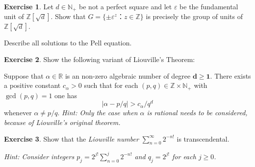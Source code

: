 \documentclass[12pt,a4paper]{article}
\theoremstyle{plain}
\newtheorem*{Sol*}{Solution}
\theoremstyle{definition}
\newtheorem{Ex}{Exercise}
\newif\ifsolutions
\newcommand{\exercise}[2]{
			\begin{Ex} #1 \end{Ex}
			\ifsolutions  \begin{Sol*} #2 \end{Sol*} \bigskip \else \bigskip  \fi
		}
\begin{document}
\exercise{ Let $d ∈ ℕ_+$ be not a perfect square and let $ε$ be the fundamental unit of $ℤ[\sqrt{d}]$. Show that $G = \{ \pm ε ^z ： z ∈ℤ\}$  is precisely the group of units of $ℤ[\sqrt{d}]$.

  \bigskip
  
  \noindent
  Describe all solutions to the Pell equation. 
}
{
	Let $\alpha = x + y\sqrt{d}$ be a unit of $Z[\sqrt{d}]$. We show that $\alpha$ belongs to $G$.

	We may write $x - y\sqrt{d}, -x + y\sqrt{d}$, and $-x - y\sqrt{d}$ as $\pm \alpha^{-1}$ and $-\alpha$, so that we may suppose $x, y \geq 0$.

	The case $x=1, y=0$ corresponds to $n=0$ in $G$, which lets us assume that $\alpha > 1$.

	There therefore exists an $n \geq 1$ such that
		\[ \epsilon^n \leq \alpha < \epsilon^{n+1}, \]
	by minimality of $\epsilon$.

	This means that $1 \leq \alpha \epsilon^{-n} < \alpha$. 
	By exercise 4ii), one must have $\alpha = \epsilon^n$, which concludes.
}



\exercise{
  Show the following variant of Liouville's Theorem:

  \bigskip 
  
  \noindent  
    Suppose that $α∈ ℝ$ is an non-zero algebraic number of degree $\mathbf{d ≥1}$. There exists a positive constant $c_α>0$ such that for each $(p,q) ∈ ℤ×ℕ_+$ with $\gcd(p,q) = 1$ one has
  \begin{displaymath}
    |α - p/q| > c_α/q^d
  \end{displaymath}
    whenever $\alpha \neq p/q$.
\smallskip 
\noindent 
\emph{Hint: Only the case when $α$ is rational needs to be considered, because of Liouville's original theorem.}
}{}


\exercise{Show that the \emph{Liouville number} $∑_{n=0}^{∞} 2^{-n!}$ is transcendental.

  \bigskip

\emph{Hint:   Consider integers  $p_j = 2^{j!} ∑_{n=0}^j 2^{-n!}$ and $q_j = 2^{j!}$ for each $j \geq 0$. }
  
}{}
  
\end{document}
